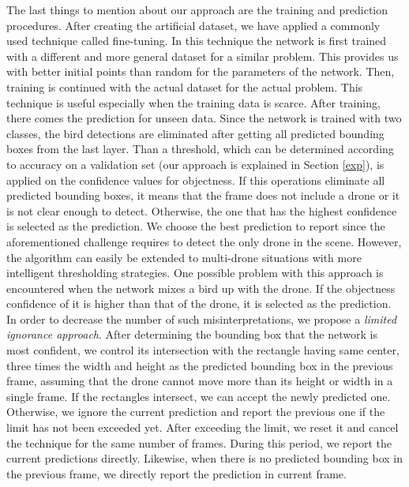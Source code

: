 \documentclass[10pt,twocolumn,letterpaper]{article}
\begin{document}
The last things to mention about our approach are the training and prediction procedures. After creating the artificial dataset, we have applied a commonly used technique called fine-tuning. In this technique the network is first trained with a different and more general dataset for a similar problem. This provides us with better initial points than random for the parameters of the network. Then, training is continued with the actual dataset for the actual problem. This technique is useful especially when the training data is scarce. After training, there comes the prediction for unseen data. Since the network is trained with two classes, the bird detections are eliminated after getting all predicted bounding boxes from the last layer. Than a threshold, which can be determined according to accuracy on a validation set (our approach is explained in Section \ref{exp}), is applied on the confidence values for objectness. If this operations eliminate all predicted bounding boxes, it means that the frame does not include a drone or it is not clear enough to detect. Otherwise, the one that has the highest confidence is selected as the prediction. We choose the best prediction to report since the aforementioned challenge requires to detect the only drone in the scene. However, the algorithm can easily be extended to multi-drone situations with more intelligent thresholding strategies. One possible problem with this approach is encountered when the network mixes a bird up with the drone. If the objectness confidence of it is higher than that of the drone, it is selected as the prediction. In order to decrease the number of such misinterpretations, we propose a \textit{limited ignorance approach}. After determining the bounding box that the network is most confident, we control its intersection with the rectangle having same center, three times the width and height as the predicted bounding box in the previous frame, assuming that the drone cannot move more than its height or width in a single frame. If the rectangles intersect, we can accept the newly predicted one. Otherwise, we ignore the current prediction and report the previous one if the limit has not been exceeded yet. After exceeding the limit, we reset it and cancel the technique for the same number of frames. During this period, we report the current predictions directly. Likewise, when there is no predicted bounding box in the previous frame, we directly report the prediction in current frame.
\end{document}
